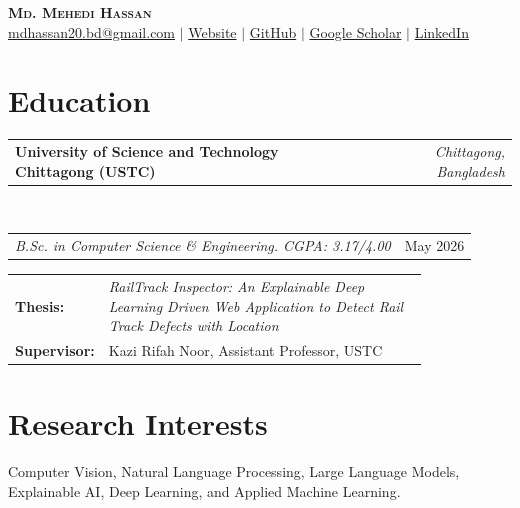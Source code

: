 \documentclass[10pt]{article}
\makeatletter
\newcommand{\entry}[2]{%
  \noindent\begin{tabularx}{\linewidth}{@{}X r@{}}
    \textbf{#1} & \textit{\small #2}
  \end{tabularx}\vspace{-1pt}
}
\newcommand{\subentry}[2]{%
  \noindent\begin{tabularx}{\linewidth}{@{}X r@{}}
    \textit{\small #1} & {\small #2}
  \end{tabularx}\vspace{1pt}
}
\makeatother
\begin{document}
\begin{center}
  {\Huge\bfseries\scshape Md. Mehedi Hassan}\\[5pt]
  {\small
    \href{mailto:mdhassan20.bd@gmail.com}{mdhassan20.bd@gmail.com} \quad$|$\quad
    \href{https://mehedihassanbd.netlify.app/}{Website} \quad$|$\quad
    \href{https://github.com/mehedi-hassan}{GitHub} \quad$|$\quad
    \href{https://scholar.google.com/citations?user=qikyEyMAAAAJ&hl=en&authuser=2}{Google Scholar} \quad$|$\quad
    \href{https://www.linkedin.com/in/hassanmehedi/}{LinkedIn}
  }
\end{center}

\section{Education}
\entry{University of Science and Technology Chittagong (USTC)}{Chittagong, Bangladesh}\\[1pt]
\subentry{B.Sc. in Computer Science \& Engineering. CGPA: 3.17/4.00}{May 2026}
\vspace{2pt}
\hspace*{14pt}
\begin{tabular}{@{}l p{0.82\linewidth}@{}}
\textbf{Thesis:}     & \textit{RailTrack Inspector: An Explainable Deep Learning Driven Web Application to Detect Rail Track Defects with Location} \\
\textbf{Supervisor:} & Kazi Rifah Noor, Assistant Professor, USTC
\end{tabular}


\section{Research Interests}
Computer Vision, Natural Language Processing, Large Language Models, Explainable AI, Deep Learning, and Applied Machine Learning.

\end{document}
